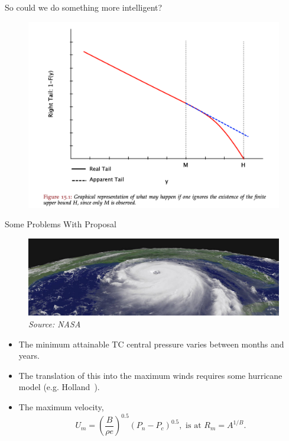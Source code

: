 \begin{frame}{So could we do something more intelligent?~\cite{taleb2019statistical}}
\vspace{-20pt}
 \begin{minipage}{1.0\textwidth}
\begin{figure}[htb!]
    \centering
    \includegraphics[width=1\linewidth]{images/nnt-upper-bound.png}
    \vspace{-15pt}

\end{figure}
\end{minipage}
\end{frame}

\begin{frame}{Some Problems With Proposal}
\begin{figure}
\includegraphics[width=\linewidth]{images/NASA-KATRINA-SIDEON.jpg}\\
\textit{Source: NASA}
\end{figure}
\begin{itemize}
\item The minimum attainable TC central pressure varies between months and years.
\item The translation of this into the maximum winds requires some hurricane model
    (e.g. Holland~\cite{holland1980analytic, holland2010revised}).
\item
    The maximum velocity,
    \begin{equation}
    U_m = (\frac{B}{\rho e})^{0.5}(P_n-P_c)^{0.5}, \text{ is at }
    R_m = A^{1/B}.
    \end{equation}
\end{itemize}
\end{frame}


